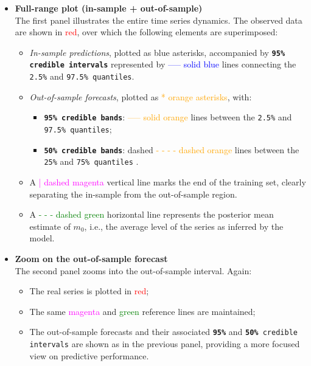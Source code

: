 \documentclass{Configuration_Files/PoliMi3i_thesis}
\begin{document}
\begin{itemize}
  \item \textbf{Full-range plot (in-sample + out-of-sample)}\\
  The first panel illustrates the entire time series dynamics. The observed data are shown in \textcolor{red}{red}, over which the following elements are superimposed:
  \begin{itemize}
    \item \textit{In-sample predictions}, plotted as blue asterisks, accompanied by \texttt{\textbf{95\% credible intervals}} represented by \textcolor{blue}{----- solid blue} lines connecting the \texttt{2.5\%} and \texttt{97.5\% quantiles}.
    \item \textit{Out-of-sample forecasts}, plotted as \textcolor{orange}{* orange asterisks}, with:
    \begin{itemize}
      \item \texttt{\textbf{95\% credible bands}}: \textcolor{orange}{----- solid orange} lines between the \texttt{2.5\%} and \texttt{97.5\% quantiles};
      \item \texttt{\textbf{50\% credible bands}}: dashed \textcolor{orange}{- - - - dashed orange} lines between the \texttt{25\%} and \texttt{75\% quantiles} .
    \end{itemize}
    \item A \textcolor{magenta}{| dashed magenta} vertical line marks the end of the training set, clearly separating the in-sample from the out-of-sample region.
    \item A \textcolor{green}{- - - dashed green} horizontal line represents the posterior mean estimate of $m_0$, i.e., the average level of the series as inferred by the model.
  \end{itemize}

  \item \textbf{Zoom on the out-of-sample forecast}\\
  The second panel zooms into the out-of-sample interval. Again:
  \begin{itemize}
    \item The real series is plotted in \textcolor{red}{red};
    \item The same \textcolor{magenta}{magenta} and \textcolor{green}{green} reference lines are maintained;
    \item The out-of-sample forecasts and their associated \texttt{\textbf{95\%}} and \texttt{\textbf{50\%} credible intervals} are shown as in the previous panel, providing a more focused view on predictive performance.
  \end{itemize}
\end{itemize}
\end{document}
